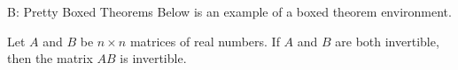 \documentclass[]{beamer}
\theoremstyle{plain}
\newcounter{theo}[section]\setcounter{theo}{0}
\begin{document}
	
\begin{frame}{B: Pretty Boxed Theorems}
	Below is an example of a boxed theorem environment.
	
	\begin{theorem}
		Let $A$ and $B$ be $ n\times n $ matrices of real numbers. If $ A $ and $ B $ are both invertible, then the matrix $ AB $ is invertible.
	\end{theorem}
\end{frame}
	
\end{document}
